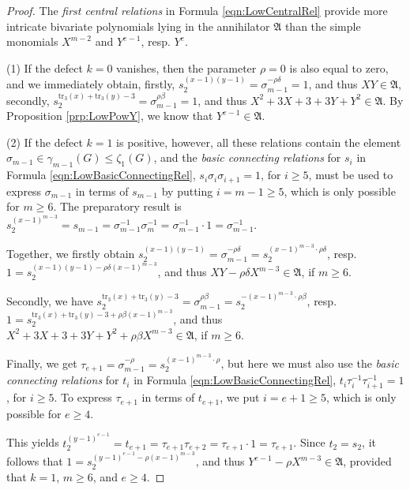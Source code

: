 \documentclass{amsart}
\theoremstyle{definition}
\numberwithin{equation}{section}
\begin{document}
\begin{proof}
The \textit{first central relations} in Formula
\eqref{eqn:LowCentralRel}
provide more intricate bivariate polynomials lying in the annihilator \(\mathfrak{A}\)
than the simple monomials \(X^{m-2}\) and \(Y^{e-1}\), resp. \(Y^e\).

\noindent
(1)
If the defect \(k=0\) vanishes, then the parameter \(\rho=0\) is also equal to zero,
and we immediately obtain,
firstly, \(s_2^{(x-1)(y-1)}=\sigma_{m-1}^{-\rho\delta}=1\), and thus \(XY\in\mathfrak{A}\), secondly,
\(s_2^{\mathrm{tr}_3(x)+\mathrm{tr}_3(y)-3}=\sigma_{m-1}^{\rho\beta}=1\), and thus \(X^2+3X+3+3Y+Y^2\in\mathfrak{A}\).
By Proposition
\ref{prp:LowPowY},
we know that \(Y^{e-1}\in\mathfrak{A}\).

\noindent
(2)
If the defect \(k=1\) is positive, however,
all these relations contain the element \(\sigma_{m-1}\in\gamma_{m-1}(G)\le\zeta_1(G)\),
and the \textit{basic connecting relations} for \(s_i\) in Formula
\eqref{eqn:LowBasicConnectingRel},
\(s_i\sigma_i\sigma_{i+1}=1\), for \(i\ge 5\),
must be used to express \(\sigma_{m-1}\) in terms of \(s_{m-1}\)
by putting \(i=m-1\ge 5\), which is only possible for \(m\ge 6\).
The preparatory result is
\(s_2^{(x-1)^{m-3}}=s_{m-1}=\sigma_{m-1}^{-1}\sigma_m^{-1}=\sigma_{m-1}^{-1}\cdot 1=\sigma_{m-1}^{-1}\).

Together, we firstly obtain
\(s_2^{(x-1)(y-1)}=\sigma_{m-1}^{-\rho\delta}=s_2^{(x-1)^{m-3}\cdot\rho\delta}\),
resp. \(1=s_2^{(x-1)(y-1)-\rho\delta(x-1)^{m-3}}\),
and thus \(XY-\rho\delta X^{m-3}\in\mathfrak{A}\), if \(m\ge 6\).

Secondly, we have
\(s_2^{\mathrm{tr}_3(x)+\mathrm{tr}_3(y)-3}=\sigma_{m-1}^{\rho\beta}=s_2^{-(x-1)^{m-3}\cdot\rho\beta}\),
resp. \(1=s_2^{\mathrm{tr}_3(x)+\mathrm{tr}_3(y)-3+\rho\beta(x-1)^{m-3}}\),
and thus \(X^2+3X+3+3Y+Y^2+\rho\beta X^{m-3}\in\mathfrak{A}\), if \(m\ge 6\).

Finally, we get
\(\tau_{e+1}=\sigma_{m-1}^{-\rho}=s_2^{(x-1)^{m-3}\cdot\rho}\),
but here we must also use
the \textit{basic connecting relations} for \(t_i\) in Formula
\eqref{eqn:LowBasicConnectingRel},
\(t_i\tau_i^{-1}\tau_{i+1}^{-1}=1\), for \(i\ge 5\).
To express \(\tau_{e+1}\) in terms of \(t_{e+1}\),
we put \(i=e+1\ge 5\), which is only possible for \(e\ge 4\).

This yields
\(t_2^{(y-1)^{e-1}}=t_{e+1}=\tau_{e+1}\tau_{e+2}=\tau_{e+1}\cdot 1=\tau_{e+1}\).
Since \(t_2=s_2\), it follows that
\(1=s_2^{(y-1)^{e-1}-\rho(x-1)^{m-3}}\),
and thus \(Y^{e-1}-\rho X^{m-3}\in\mathfrak{A}\), provided that \(k=1\), \(m\ge 6\), and \(e\ge 4\).


\end{proof}
\end{document}

